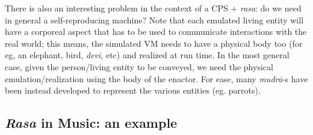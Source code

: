 There is also an interesting problem in the context of a CPS + \textsl{rasa}: do we need in general a self-reproducing machine? Note that each emulated living entity will have a corporeal aspect that has to be used to communicate interactions with the real world; this means, the simulated VM needs to have a physical body too (for eg, an elephant, bird, \textsl{devi}, etc) and realized at run time. In the most general case, given the person/living entity to be conveyed, we need the physical emulation/realization using the body of the enactor. For ease, many \textsl{mudrā}-s have been instead developed to represent the various entities (eg. parrots).\\[-20pt]

\subsection{\textsl{Rasa} in Music: an example}\label{chap3-sec4.3}

